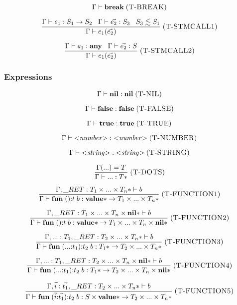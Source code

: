 \documentclass[12pt]{article}
\newcommand{\Top}{\mathbf{value}}
\newcommand{\Any}{\mathbf{any}}
\newcommand{\Nil}{\mathbf{nil}}
\newcommand{\False}{\mathbf{false}}
\newcommand{\True}{\mathbf{true}}
\newcommand{\kw}[1]{\mathbf{#1}}
\newcommand{\mylabel}[1]{\; (\textsc{#1})}
\newcommand{\env}{\Gamma}
\newcommand{\ret}{\string_RET}
\begin{document}
\[
\env \vdash \kw{break}
\mylabel{T-BREAK}
\]

\[
\frac{\env \vdash e_{1}:S_{1} \rightarrow S_{2} \;\;\;
      \env \vdash \vec{e_{2}}:S_{3} \;\;\;
      S_{3} \lesssim S_{1}}
     {\env \vdash e_{1}(\vec{e_{2}})}
\mylabel{T-STMCALL1}
\]

\[
\frac{\env \vdash e_{1}:\Any \;\;\;
      \env \vdash \vec{e_{2}}:S}
     {\env \vdash e_{1}(\vec{e_{2}})}
\mylabel{T-STMCALL2}
\]

\subsubsection{Expressions}

\[
\env \vdash \kw{nil} : \Nil
\mylabel{T-NIL}
\]

\[
\env \vdash \kw{false} : \False
\mylabel{T-FALSE}
\]

\[
\env \vdash \kw{true} : \True
\mylabel{T-TRUE}
\]

\[
\env \vdash {<}{\it number}{>} : {<}{\it number}{>}
\mylabel{T-NUMBER}
\]

\[
\env \vdash {<}{\it string}{>} : {<}{\it string}{>}
\mylabel{T-STRING}
\]

\[
\frac{\env({...}) = T}
     {\env \vdash {...} : T{*}}
\mylabel{T-DOTS}
\]

\[
\frac{\env, \ret:T_{1} \times ... \times T_{n}* \vdash b}
     {\env \vdash \kw{fun} \; (){:}t \; b :
      \Top{*} \rightarrow T_{1} \times ... \times T_{n}*}
\mylabel{T-FUNCTION1}
\]

\[
\frac{\env, \ret:T_{1} \times ... \times T_{n} \times \Nil{*} \vdash b}
     {\env \vdash \kw{fun} \; (){:}t \; b :
      \Top{*} \rightarrow T_{1} \times ... \times T_{n} \times \Nil{*}}
\mylabel{T-FUNCTION2}
\]

\[
\frac{\env, {...}:T_{1}, \ret:T_{2} \times ... \times T_{n}* \vdash b}
     {\env \vdash \kw{fun} \; ({...}{:}t_{1}){:}t_{2} \; b :
      T_{1}{*} \rightarrow T_{2} \times ... \times T_{n}*}
\mylabel{T-FUNCTION3}
\]

\[
\frac{\env, {...}:T_{1}, \ret:T_{2} \times ... \times T_{n} \times \Nil{*} \vdash b}
     {\env \vdash \kw{fun} \; ({...}{:}t_{1}){:}t_{2} \; b :
      T_{1}{*} \rightarrow T_{2} \times ... \times T_{n} \times \Nil{*}}
\mylabel{T-FUNCTION4}
\]

\[
\frac{\env, \vec{i}:\vec{t_{1}},
      \ret:T_{2} \times ... \times T_{n}* \vdash b}
     {\env \vdash \kw{fun} \; (\vec{i}{:}\vec{t_{1}}){:}t_{2} \; b :
      S \times \Top{*} \rightarrow T_{2} \times ... \times T_{n}*}
\mylabel{T-FUNCTION5}
\]
\end{document}
